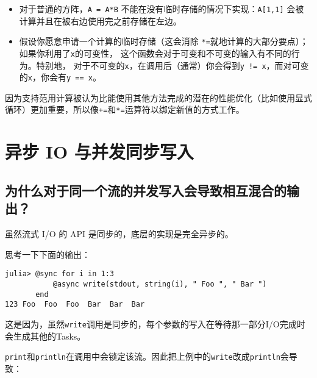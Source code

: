 \begin{itemize}
\item 对于普通的方阵，\texttt{A = A*B} 不能在没有临时存储的情况下实现：\texttt{A[1,1]} 会被计算并且在被右边使用完之前存储在左边。


\item 假设你愿意申请一个计算的临时存储（这会消除 \texttt{*=}就地计算的大部分要点）；如果你利用了\texttt{x}的可变性， 这个函数会对于可变和不可变的输入有不同的行为。特别地， 对于不可变的\texttt{x}，在调用后（通常）你会得到\texttt{y != x}，而对可变的\texttt{x}，你会有\texttt{y == x}。

\end{itemize}


因为支持范用计算被认为比能使用其他方法完成的潜在的性能优化（比如使用显式循环）更加重要，所以像\texttt{+=}和\texttt{*=}运算符以绑定新值的方式工作。



\hypertarget{11478691918903630142}{}


\section{异步 IO 与并发同步写入}



\hypertarget{6102848140854273508}{}


\subsection{为什么对于同一个流的并发写入会导致相互混合的输出？}



虽然流式 I/O 的 API 是同步的，底层的实现是完全异步的。



思考一下下面的输出：




\begin{verbatim}
julia> @sync for i in 1:3
           @async write(stdout, string(i), " Foo ", " Bar ")
       end
123 Foo  Foo  Foo  Bar  Bar  Bar
\end{verbatim}



这是因为，虽然\texttt{write}调用是同步的，每个参数的写入在等待那一部分I/O完成时会生成其他的Tasks。



\texttt{print}和\texttt{println}在调用中会{\textquotedbl}锁定{\textquotedbl}该流。因此把上例中的\texttt{write}改成\texttt{println}会导致：





